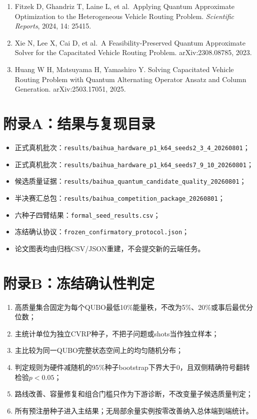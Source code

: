 \documentclass[
  10.5pt,
  UTF8]{ctexart}
\providecommand{\tightlist}{%
  \setlength{\itemsep}{0pt}\setlength{\parskip}{0pt}}
\begin{document}
\begin{enumerate}
\item
  Fitzek D, Ghandriz T, Laine L, et al.~Applying Quantum Approximate Optimization to the Heterogeneous Vehicle Routing Problem. \emph{Scientific Reports}, 2024, 14: 25415.
\item
  Xie N, Lee X, Cai D, et al.~A Feasibility-Preserved Quantum Approximate Solver for the Capacitated Vehicle Routing Problem. arXiv:2308.08785, 2023.
\item
  Huang W H, Matsuyama H, Yamashiro Y. Solving Capacitated Vehicle Routing Problem with Quantum Alternating Operator Ansatz and Column Generation. arXiv:2503.17051, 2025.
\end{enumerate}

\section{附录A：结果与复现目录}\label{ux9644ux5f55aux7ed3ux679cux4e0eux590dux73b0ux76eeux5f55}

\begin{itemize}
\tightlist
\item
  正式真机批次：\texttt{results/baihua\_hardware\_p1\_k64\_seeds2\_3\_4\_20260801}；
\item
  正式真机批次：\texttt{results/baihua\_hardware\_p1\_k64\_seeds7\_9\_10\_20260801}；
\item
  候选质量证据：\texttt{results/baihua\_quantum\_candidate\_quality\_20260801}；
\item
  半决赛汇总包：\texttt{results/baihua\_competition\_package\_20260801}；
\item
  六种子四臂结果：\texttt{formal\_seed\_results.csv}；
\item
  冻结确认协议：\texttt{frozen\_confirmatory\_protocol.json}；
\item
  论文图表均由归档CSV/JSON重建，不会提交新的云端任务。
\end{itemize}

\section{附录B：冻结确认性判定}\label{ux9644ux5f55bux51bbux7ed3ux786eux8ba4ux6027ux5224ux5b9a}

\begin{enumerate}
\def\labelenumi{\arabic{enumi}.}
\tightlist
\item
  高质量集合固定为每个QUBO最低10\%能量秩，不改为5\%、20\%或事后最优分位数；
\item
  主统计单位为独立CVRP种子，不把子问题或shots当作独立样本；
\item
  主比较为同一QUBO完整状态空间上的均匀随机分布；
\item
  判定规则为硬件减随机的95\%种子bootstrap下界大于0，且双侧精确符号翻转检验\(p<0.05\)；
\item
  路线改善、容量修复和组合门槛只作为下游诊断，不改变量子候选质量判定；
\item
  所有预注册种子进入主结果；无局部余量实例按零改善纳入总体端到端统计。
\end{enumerate}
\end{document}
